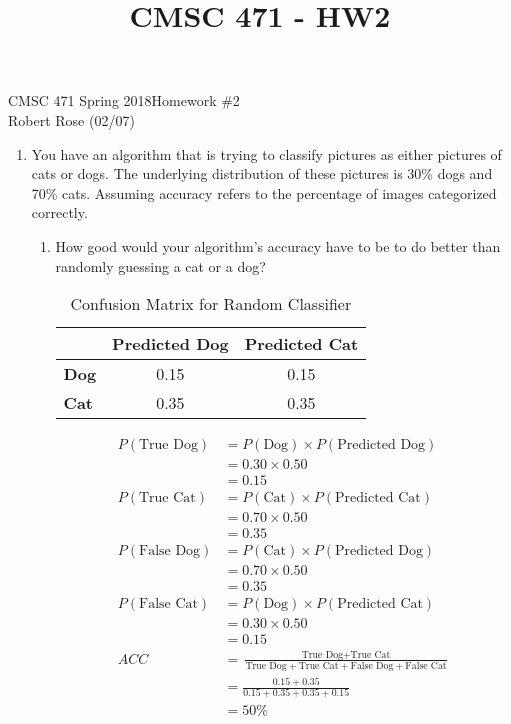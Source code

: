 \documentclass[12pt]{article}
\title{CMSC 471 - HW2}
\begin{document}

CMSC 471 Spring 2018\hfill Homework \#2\\
Robert Rose (02/07)

\hrulefill

\begin{enumerate}
\item You have an algorithm that is trying to classify pictures as either pictures of cats or dogs. The underlying distribution of these pictures is 30\% dogs and 70\% cats. Assuming accuracy refers to the percentage of images categorized correctly.
  \begin{enumerate}
  \item How good would your algorithm's accuracy have to be to do better than randomly guessing a cat or a dog?
    \vspace{-1em}
    \begin{table}[h!]
      \begin{center}
          \caption{Confusion Matrix for Random Classifier}
          \label{tab:table2}
          \begin{tabular}{l|c|c}
            & \textbf{Predicted Dog} & \textbf{Predicted Cat} \\
            \hline
            \textbf{Dog} & 0.15 & 0.15 \\
            \textbf{Cat} & 0.35 & 0.35 \\
          \end{tabular}
      \end{center}
    \end{table}

    \vspace{-2em}

    \begin{align*}
      P(\text{True Dog}) &= P(\text{Dog}) \times P(\text{Predicted Dog})\\
        &= 0.30 \times 0.50\\
        &= 0.15\\
        P(\text{True Cat}) &= P(\text{Cat}) \times P(\text{Predicted Cat})\\
        &= 0.70 \times 0.50\\
        &= 0.35\\
      P(\text{False Dog}) &= P(\text{Cat}) \times P(\text{Predicted Dog})\\
        &= 0.70 \times 0.50\\
        &= 0.35\\
        P(\text{False Cat}) &= P(\text{Dog}) \times P(\text{Predicted Cat})\\
        &= 0.30 \times 0.50\\
        &= 0.15\\
        ACC &= \frac{\text{True Dog} + \text{True Cat}}{\text{True Dog} + \text{True Cat} + \text{False Dog} + \text{False Cat}}\\[8pt]
        &= \frac{0.15 + 0.35}{0.15 + 0.35 + 0.35 + 0.15}\\[8pt]
        &= \boxed{50\%}
  \end{align*}


\end{enumerate}
\end{enumerate}
\end{document}
